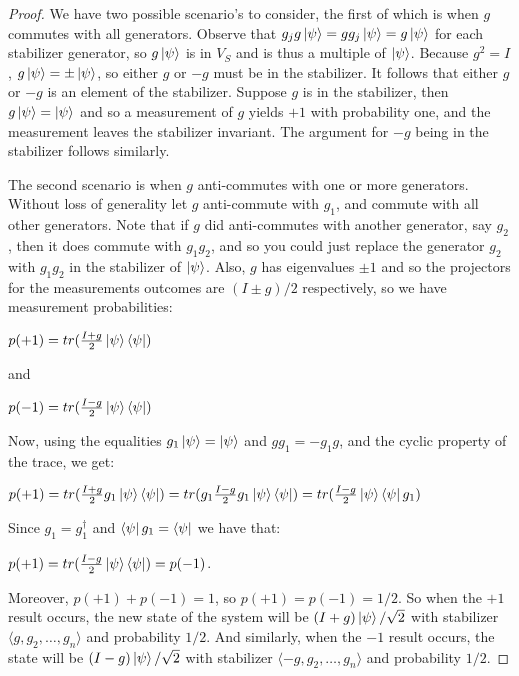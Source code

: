 \documentclass[12pt]{dalthesis}
\begin{document}
\begin{proof}
We have two possible scenario's to consider, the first of which is when $g$ commutes with all generators. Observe that $g_jg\ket{\psi} = gg_j\ket{\psi} = g\ket{\psi}$ for each stabilizer generator, so $g\ket{\psi}$ is in $V_S$ and is thus a multiple of $\ket{\psi}$. Because $g^2 = I$, $g\ket{\psi} = \pm\ket{\psi}$, so either $g$ or $-g$ must be in the stabilizer. It follows that either $g$ or $-g$ is an element of the stabilizer. Suppose $g$ is in the stabilizer, then $g\ket{\psi} = \ket{\psi}$ and so a measurement of $g$ yields $+1$ with probability one, and the measurement leaves the stabilizer invariant. The argument for $-g$ being in the stabilizer follows similarly.

The second scenario is when $g$ anti-commutes with one or more generators. Without loss of generality let $g$ anti-commute with $g_1$, and commute with all other generators. Note that if $g$ did anti-commutes with another generator, say $g_2$, then it does commute with $g_1g_2$, and so you could just replace the generator $g_2$ with $g_1g_2$ in the stabilizer of $\ket{\psi}$. Also, $g$ has eigenvalues $\pm 1$ and so the projectors for the measurements outcomes are $(I \pm g)/2$ respectively, so we have measurement probabilities:
\begin{center}
$p(+1) = tr(\frac{I+g}{2}\ket{\psi}\bra{\psi})$
\end{center}
and 
\begin{center}
$p(-1) = tr(\frac{I-g}{2}\ket{\psi}\bra{\psi})$
\end{center}
Now, using the equalities $g_1\ket{\psi} = \ket{\psi}$ and $gg_1 = -g_1g$, and the cyclic property of the trace, we get:
\begin{center}
$p(+1) = tr(\frac{I+g}{2}g_1\ket{\psi}\bra{\psi}) = tr(g_1\frac{I-g}{2}g_1\ket{\psi}\bra{\psi}) = tr(\frac{I-g}{2}\ket{\psi}\bra{\psi}g_1)$
\end{center}
Since $g_1 = g_1^{\dag}$ and $\bra{\psi}g_1 = \bra{\psi}$ we have that:
\begin{center}
$p(+1) = tr(\frac{I-g}{2}\ket{\psi}\bra{\psi}) = p(-1)$.
\end{center}
Moreover, $p(+1) + p(-1) = 1$, so $p(+1) = p(-1) = 1/2$. So when the $+1$ result occurs, the new state of the system will be $(I + g)\ket{\psi}/\sqrt{2}$ with stabilizer $\langle g, g_2, \dots , g_n \rangle$ and probability $1/2$. And similarly, when the $-1$ result occurs, the state will be $(I - g)\ket{\psi}/\sqrt{2}$ with stabilizer $\langle -g, g_2, \dots , g_n \rangle$ and probability $1/2$.
\end{proof}
\end{document}
